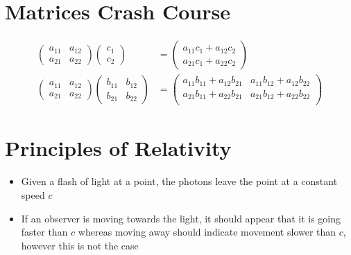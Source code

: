 \documentclass[12pt,letterpaper, twocolumn]{article}
\begin{document}
\section{Matrices Crash Course}
\begin{align*}
    \begin{pmatrix}
        a_{11} & a_{12} \\
        a_{21} & a_{22} 
      \end{pmatrix}
      \begin{pmatrix}
        c_1\\c_2
      \end{pmatrix} &=
      \begin{pmatrix}
        a_{11}c_1+a_{12}c_2\\
        a_{21}c_1+a_{22}c_2
      \end{pmatrix}
      \\
      \begin{pmatrix}
        a_{11} & a_{12} \\
        a_{21} & a_{22} 
      \end{pmatrix}
      \begin{pmatrix}
        b_{11} & b_{12} \\
        b_{21} & b_{22} 
      \end{pmatrix} &=
      \begin{pmatrix}
        a_{11}b_{11} + a_{12}b_{21} & a_{11}b_{12} + a_{12}b_{22} \\
        a_{21}b_{11} + a_{22}b_{21} & a_{21}b_{12} + a_{22}b_{22} \\
      \end{pmatrix}
\end{align*}

\section{Principles of Relativity}
\begin{itemize}
    \item Given a flash of light at a point, the photons leave the point at a constant speed $c$
    \item If an observer is moving towards the light, it should appear that it is going faster than $c$ whereas moving away should indicate movement slower than $c$, however this is not the case 
\end{itemize}
\end{document}
